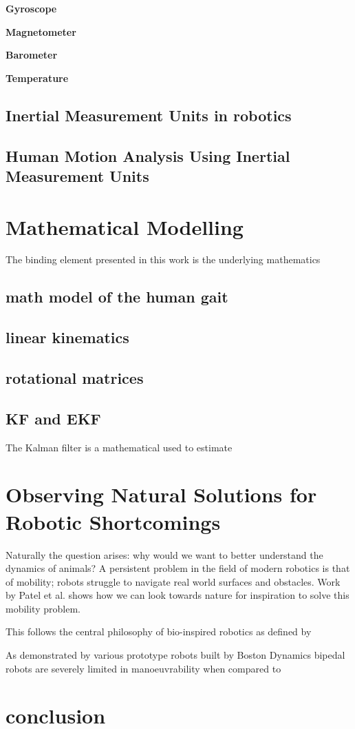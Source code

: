 \textbf{Gyroscope}

\textbf{Magnetometer}

\textbf{Barometer}

\textbf{Temperature}



\subsection{Inertial Measurement Units in robotics}

\subsection{Human Motion Analysis Using Inertial Measurement Units}


\section{Mathematical Modelling}
The binding element presented in this work is the underlying mathematics

\subsection{math model of the human gait}


\subsection{linear kinematics}

\subsection{rotational matrices}

\subsection{KF and EKF}
The Kalman filter is a mathematical used to estimate



\section{Observing Natural Solutions for Robotic Shortcomings}
Naturally the question arises:  why would we want to better understand the dynamics of animals? A persistent problem in the field of modern robotics is that of mobility; robots struggle to navigate real world surfaces and obstacles. Work by Patel et al. \cite{patel2013rapid} shows how we can look towards nature for inspiration to solve this mobility problem.

This follows the central philosophy of bio-inspired robotics as defined by 

As demonstrated by various prototype robots built by Boston Dynamics bipedal robots are severely limited in manoeuvrability when compared to   

\section{conclusion}








